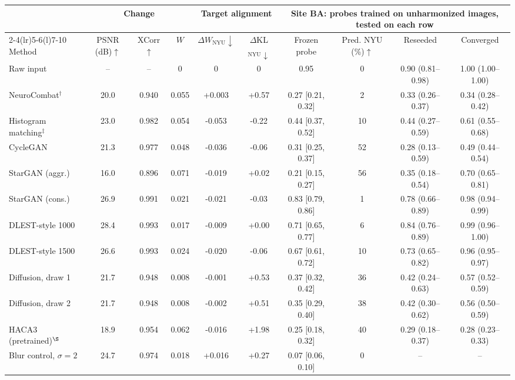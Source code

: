 \begin{tabular}{@{}lccccccccc@{}}
\toprule
 & \multicolumn{3}{c}{Change} & \multicolumn{2}{c}{Target alignment} & \multicolumn{4}{c}{Site BA: probes trained on unharmonized images, tested on each row} \\
\cmidrule(lr){2-4}\cmidrule(lr){5-6}\cmidrule(l){7-10}
Method & PSNR (dB)$\uparrow$ & XCorr$\uparrow$ & $W$ & $\Delta W_{\mathrm{NYU}}\!\downarrow$ & $\Delta$KL$_{\mathrm{NYU}}\!\downarrow$ & Frozen probe & Pred. NYU (\%)$\uparrow$ & Reseeded & Converged \\
\midrule
Raw input & -- & -- & 0 & 0 & 0 & 0.95 & 0 & 0.90 (0.81--0.98) & 1.00 (1.00--1.00) \\
NeuroCombat$^\dagger$ & 20.0 & 0.940 & 0.055 & +0.003 & +0.57 & 0.27 [0.21, 0.32] & 2 & 0.33 (0.26--0.37) & 0.34 (0.28--0.42) \\
Histogram matching$^\ddagger$ & 23.0 & 0.982 & 0.054 & -0.053 & -0.22 & 0.44 [0.37, 0.52] & 10 & 0.44 (0.27--0.59) & 0.61 (0.55--0.68) \\
CycleGAN & 21.3 & 0.977 & 0.048 & -0.036 & -0.06 & 0.31 [0.25, 0.37] & 52 & 0.28 (0.13--0.59) & 0.49 (0.44--0.54) \\
StarGAN (aggr.) & 16.0 & 0.896 & 0.071 & -0.019 & +0.02 & 0.21 [0.15, 0.27] & 56 & 0.35 (0.18--0.54) & 0.70 (0.65--0.81) \\
StarGAN (cons.) & 26.9 & 0.991 & 0.021 & -0.021 & -0.03 & 0.83 [0.79, 0.86] & 1 & 0.78 (0.66--0.89) & 0.98 (0.94--0.99) \\
DLEST-style 1000 & 28.4 & 0.993 & 0.017 & -0.009 & +0.00 & 0.71 [0.65, 0.77] & 6 & 0.84 (0.76--0.89) & 0.99 (0.96--1.00) \\
DLEST-style 1500 & 26.6 & 0.993 & 0.024 & -0.020 & -0.06 & 0.67 [0.61, 0.72] & 10 & 0.73 (0.65--0.82) & 0.96 (0.95--0.97) \\
Diffusion, draw 1 & 21.7 & 0.948 & 0.008 & -0.001 & +0.53 & 0.37 [0.32, 0.42] & 36 & 0.42 (0.24--0.63) & 0.57 (0.52--0.59) \\
Diffusion, draw 2 & 21.7 & 0.948 & 0.008 & -0.002 & +0.51 & 0.35 [0.29, 0.40] & 38 & 0.42 (0.30--0.62) & 0.56 (0.50--0.59) \\
HACA3 (pretrained)$^\S$ & 18.9 & 0.954 & 0.062 & -0.016 & +1.98 & 0.25 [0.18, 0.32] & 40 & 0.29 (0.18--0.37) & 0.28 (0.23--0.33) \\
\midrule
Blur control, $\sigma{=}2$ & 24.7 & 0.974 & 0.018 & +0.016 & +0.27 & 0.07 [0.06, 0.10] & 0 & -- & -- \\
\bottomrule
\end{tabular}

